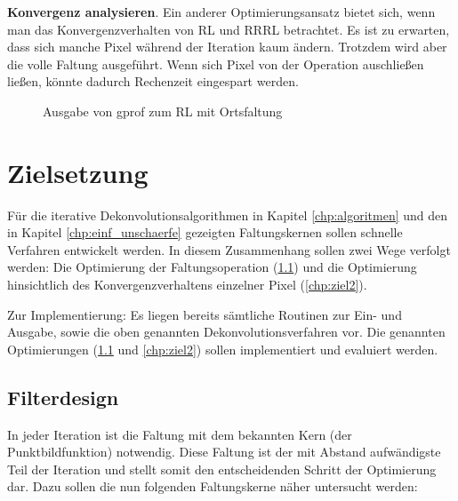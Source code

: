 \documentclass[a4paper,12pt]{article}
\begin{document}
\textbf{Konvergenz analysieren}.
Ein anderer Optimierungsansatz bietet sich, wenn man das Konvergenzverhalten von
RL und RRRL betrachtet. Es ist zu erwarten, dass sich manche Pixel während der
Iteration kaum ändern. Trotzdem wird aber die volle Faltung ausgeführt. Wenn
sich Pixel von der Operation auschließen ließen, könnte dadurch Rechenzeit
eingespart werden. 


\begin{figure}[htbp]
\caption{Ausgabe von gprof zum RL mit Ortsfaltung}%
\label{figure_gprof}
\end{figure}
 

\section{Zielsetzung}
Für die iterative Dekonvolutionsalgorithmen in Kapitel \ref{chp:algoritmen} und
den in Kapitel \ref{chp:einf_unschaerfe} gezeigten Faltungskernen sollen
schnelle Verfahren entwickelt werden. In diesem Zusammenhang sollen zwei Wege
verfolgt werden: Die Optimierung der Faltungsoperation (\ref{chp:ziel1})
und die Optimierung hinsichtlich des Konvergenzverhaltens einzelner Pixel
(\ref{chp:ziel2}).

Zur Implementierung: Es liegen bereits sämtliche Routinen zur Ein- und
Ausgabe, sowie die oben genannten Dekonvolutionsverfahren vor. 
Die genannten Optimierungen (\ref{chp:ziel1} und \ref{chp:ziel2}) sollen implementiert
und evaluiert werden.

\subsection{Filterdesign} \label{chp:ziel1}

In jeder Iteration ist die Faltung mit dem bekannten Kern (der
Punktbildfunktion) notwendig. Diese Faltung ist der mit Abstand aufwändigste Teil 
der Iteration und stellt somit den entscheidenden Schritt der Optimierung
dar. Dazu sollen die nun folgenden Faltungskerne näher untersucht werden:
\end{document}
